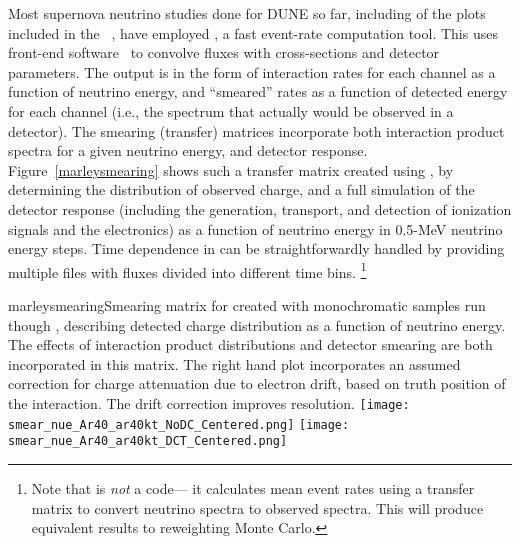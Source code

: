 Most supernova neutrino studies done for DUNE so far, including of the
plots included in the ~\cite{Acciarri:2015uup}, have employed
 \cite{snowglobes}, a fast event-rate computation tool.  This
uses %
 front-end software~\cite{Huber:2004ka} to
convolve fluxes with cross-sections and detector parameters.  The
output is in the form of interaction rates for each channel as a
function of neutrino energy, and ``smeared'' rates as a function of
detected energy for each channel (i.e., the spectrum that
actually would be observed in a detector).  
The smearing (transfer) matrices incorporate both
interaction product spectra for a given neutrino energy, and detector
response.   Figure~\ref{marleysmearing} shows such a transfer matrix
created
using , by determining the distribution of observed charge, and
 a full simulation of the detector response (including the generation,
 transport, and detection of ionization signals and the electronics)
 as a function of neutrino energy in 0.5-MeV neutrino energy steps.
Time dependence in   can be straightforwardly
handled by providing multiple files with fluxes divided into different
time bins. \footnote{Note that   is \textit{not} a 
code--- it calculates mean event rates using a transfer matrix to
convert neutrino spectra to observed spectra.  This will produce
equivalent results to reweighting Monte Carlo.}




\begin{dunefigure}{marleysmearing}{Smearing matrix for
      created with monochromatic  samples run though
    , describing detected charge distribution as a function of
    neutrino energy.  The effects of interaction product distributions
  and detector smearing are both incorporated in this matrix.  The
  right hand plot 
  incorporates an assumed correction for charge attenuation due to
  electron drift,  based on  truth position of the
  interaction.      The drift correction improves resolution.}
\texttt{[image: smear\_nue\_Ar40\_ar40kt\_NoDC\_Centered.png]}
\texttt{[image: smear\_nue\_Ar40\_ar40kt\_DCT\_Centered.png]}

\end{dunefigure}


